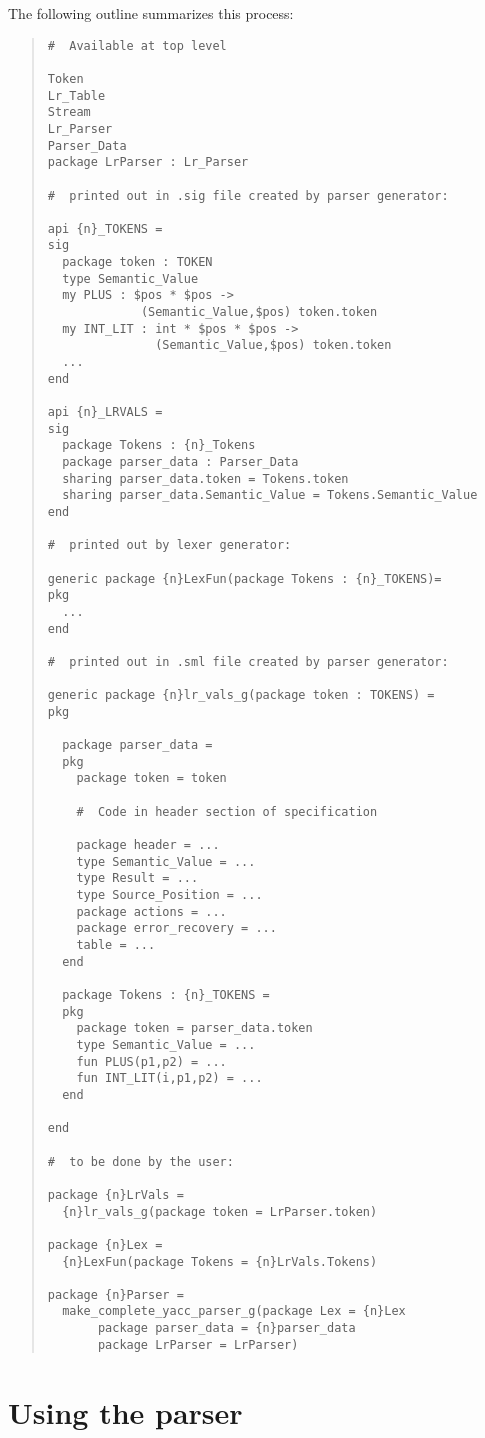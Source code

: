 The following outline summarizes this process:
\begin{quote}
\begin{verbatim}
#  Available at top level 

Token
Lr_Table
Stream
Lr_Parser
Parser_Data
package LrParser : Lr_Parser

#  printed out in .sig file created by parser generator: 

api {n}_TOKENS = 
sig
  package token : TOKEN
  type Semantic_Value
  my PLUS : $pos * $pos ->
             (Semantic_Value,$pos) token.token
  my INT_LIT : int * $pos * $pos ->
               (Semantic_Value,$pos) token.token
  ...
end

api {n}_LRVALS =
sig
  package Tokens : {n}_Tokens
  package parser_data : Parser_Data
  sharing parser_data.token = Tokens.token
  sharing parser_data.Semantic_Value = Tokens.Semantic_Value
end

#  printed out by lexer generator: 

generic package {n}LexFun(package Tokens : {n}_TOKENS)=
pkg
  ...
end

#  printed out in .sml file created by parser generator: 

generic package {n}lr_vals_g(package token : TOKENS) =
pkg

  package parser_data =
  pkg
    package token = token

    #  Code in header section of specification 

    package header = ...
    type Semantic_Value = ...
    type Result = ...
    type Source_Position = ...
    package actions = ...
    package error_recovery = ...
    table = ...
  end

  package Tokens : {n}_TOKENS =
  pkg
    package token = parser_data.token
    type Semantic_Value = ...
    fun PLUS(p1,p2) = ...
    fun INT_LIT(i,p1,p2) = ... 
  end

end

#  to be done by the user: 
 
package {n}LrVals =
  {n}lr_vals_g(package token = LrParser.token)

package {n}Lex = 
  {n}LexFun(package Tokens = {n}LrVals.Tokens)

package {n}Parser =
  make_complete_yacc_parser_g(package Lex = {n}Lex
       package parser_data = {n}parser_data
       package LrParser = LrParser)
\end{verbatim}
\end{quote}

\section{Using the parser}

